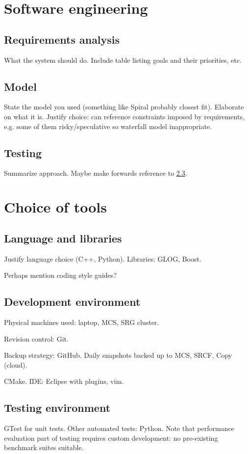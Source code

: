 \section{Software engineering} \label{sec:prep-sweng}

\subsection{Requirements analysis} \label{sec:prep-sweng-requirements}
What the system should do. Include table listing goals and their priorities, etc.

\subsection{Model}
State the model you used (something like Spiral probably closest fit). Elaborate on what it is. Justify choice: can reference constraints imposed by requirements, e.g. some of them risky/speculative so waterfall model inappropriate.

\subsection{Testing}
Summarize approach. Maybe make forwards reference to \ref{sec:prep-tools-testing}.

\section{Choice of tools} \label{sec:prep-tool-choice}
\subsection{Language and libraries}
Justify language choice (C++, Python). Libraries: GLOG, Boost.

Perhaps mention coding style guides?

\subsection{Development environment}
Physical machines used: laptop, MCS, SRG cluster.

Revision control: Git.

Backup strategy: GitHub. Daily snapshots backed up to MCS, SRCF, Copy (cloud).

CMake. IDE: Eclipse with plugins, vim.

\subsection{Testing environment} \label{sec:prep-tools-testing}
GTest for unit tests. Other automated tests: Python. Note that performance evaluation part of testing requires custom development: no pre-existing benchmark suites suitable.

